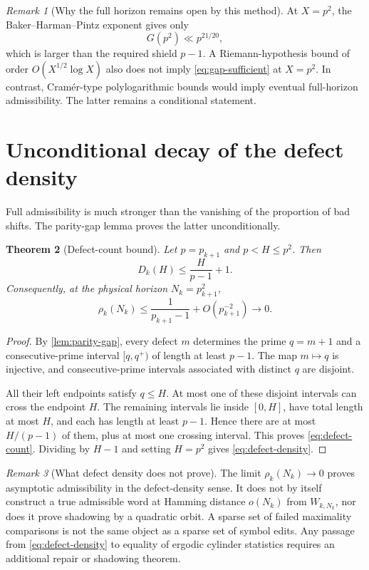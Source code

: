 \documentclass[11pt]{article}
\newtheorem{theorem}{Theorem}[section]
\theoremstyle{definition}
\theoremstyle{remark}
\newtheorem{remark}[theorem]{Remark}
\begin{document}
\begin{remark}[Why the full horizon remains open by this method]
At $X=p^2$, the Baker--Harman--Pintz exponent gives only
\[
    G(p^2)\ll p^{21/20},
\]
which is larger than the required shield $p-1$.  A Riemann-hypothesis bound of order $O(X^{1/2}\log X)$ also does not imply \eqref{eq:gap-sufficient} at $X=p^2$.  In contrast, Cram\'er-type polylogarithmic bounds \citep{Cramer1936} would imply eventual full-horizon admissibility.  The latter remains a conditional statement.
\end{remark}

\section{Unconditional decay of the defect density}

Full admissibility is much stronger than the vanishing of the proportion of bad shifts.  The parity-gap lemma proves the latter unconditionally.

\begin{theorem}[Defect-count bound]\label{thm:defect-density}
Let $p=p_{k+1}$ and $p<H\le p^2$.  Then
\begin{equation}\label{eq:defect-count}
    D_k(H)\le \frac{H}{p-1}+1.
\end{equation}
Consequently, at the physical horizon $N_k=p_{k+1}^2$,
\begin{equation}\label{eq:defect-density}
    \rho_k(N_k)
    \le \frac{1}{p_{k+1}-1}+O(p_{k+1}^{-2})
    \longrightarrow0.
\end{equation}
\end{theorem}

\begin{proof}
By \cref{lem:parity-gap}, every defect $m$ determines the prime $q=m+1$ and a consecutive-prime interval $[q,q^+)$ of length at least $p-1$.  The map $m\mapsto q$ is injective, and consecutive-prime intervals associated with distinct $q$ are disjoint.

All their left endpoints satisfy $q\le H$.  At most one of these disjoint intervals can cross the endpoint $H$.  The remaining intervals lie inside $[0,H]$, have total length at most $H$, and each has length at least $p-1$.  Hence there are at most $H/(p-1)$ of them, plus at most one crossing interval.  This proves \eqref{eq:defect-count}.  Dividing by $H-1$ and setting $H=p^2$ gives \eqref{eq:defect-density}.
\end{proof}

\begin{remark}[What defect density does not prove]\label{rem:defect-limitation}
The limit $\rho_k(N_k)\to0$ proves asymptotic admissibility in the defect-density sense.  It does not by itself construct a true admissible word at Hamming distance $o(N_k)$ from $W_{k,N_k}$, nor does it prove shadowing by a quadratic orbit.  A sparse set of failed maximality comparisons is not the same object as a sparse set of symbol edits.  Any passage from \eqref{eq:defect-density} to equality of ergodic cylinder statistics requires an additional repair or shadowing theorem.
\end{remark}
\end{document}
